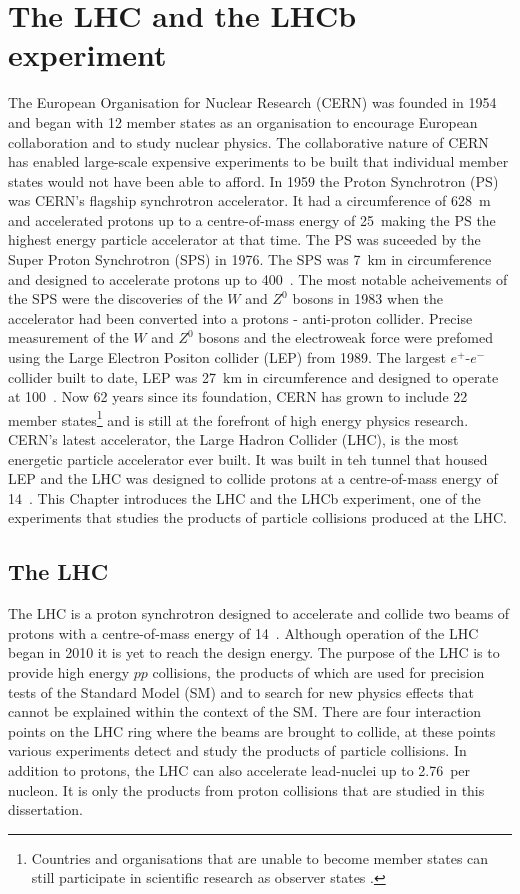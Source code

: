 \chapter{The LHC and the LHCb experiment} 
\label{CERN_LHC_LHCb}

The European Organisation for Nuclear Research (CERN) was founded in 1954 and began with 12 member states as an organisation to encourage European collaboration and to study nuclear physics. The collaborative nature of CERN has enabled large-scale expensive experiments to be built that individual member states would not have been able to afford. In 1959 the Proton Synchrotron (PS) was CERN's flagship synchrotron accelerator. It had a circumference of 628~m and accelerated protons up to a centre-of-mass energy of 25~\gev making the PS the highest energy particle accelerator at that time. 
The PS was suceeded by the Super Proton Synchrotron (SPS) in 1976. The SPS was 7~km in circumference and designed to accelerate protons up to 400~\gev. The most notable acheivements of the SPS were the discoveries of the $W$ and $Z^0$ bosons in 1983 when the accelerator had been converted into a protons - anti-proton collider. Precise measurement of the $W$ and $Z^0$ bosons and the electroweak force were prefomed using the Large Electron Positon collider (LEP) from 1989. The largest $e^+$-$e^-$ collider built to date, LEP was 27~km in circumference and designed to operate at 100~\gev. 
Now 62 years since its foundation, CERN has grown to include 22 member states\footnote{Countries and organisations that are unable to become member states can still participate in scientific research as observer states \cite{Member_States}.} and is still at the forefront of high energy physics research. CERN’s latest accelerator, the Large Hadron Collider (LHC), is the most energetic particle accelerator ever built. It was built in teh tunnel that housed LEP and the LHC was designed to collide protons at a centre-of-mass energy of 14~\tev. This Chapter introduces the LHC and the LHCb experiment, one of the experiments that studies the products of particle collisions produced at the LHC.


\section{The LHC}
\label{LHC}


The LHC is a proton synchrotron designed to accelerate and collide two beams of protons with a centre-of-mass energy of 14~\tev. Although operation of the LHC began in 2010 it is yet to reach the design energy. The purpose of the LHC is to provide high energy $pp$ collisions, the products of which are used for precision tests of the Standard Model (SM) and to search for new physics effects that cannot be explained within the context of the SM. %
There are four interaction points on the LHC ring where the beams are brought to collide, at these points various experiments detect and study the products of particle collisions. In addition to protons, the LHC can also accelerate lead-nuclei up to 2.76~\tev per nucleon. It is only the products from proton collisions that are studied in this dissertation.

